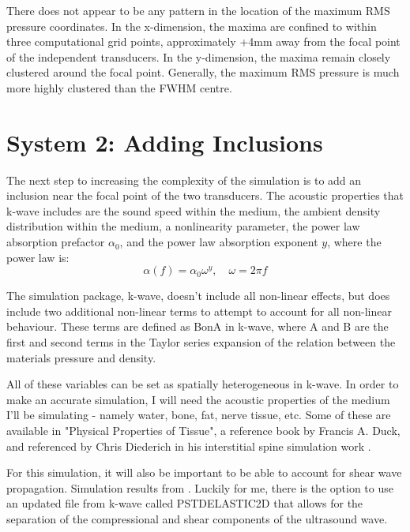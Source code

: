 \documentclass[10pt,a4paper]{article}
\begin{document}
There does not appear to be any pattern in the location of the maximum RMS pressure coordinates. In the x-dimension, the maxima are confined to within three computational grid points, approximately +4mm away from the focal point of the independent transducers. In the y-dimension, the maxima remain closely clustered around the focal point. Generally, the maximum RMS pressure is much more highly clustered than the FWHM centre.

\section{System 2: Adding Inclusions}

The next step to increasing the complexity of the simulation is to add an inclusion near the focal point of the two transducers. The acoustic properties that k-wave includes are the sound speed within the medium, the ambient density distribution within the medium, a nonlinearity parameter, the power law absorption prefactor $\alpha_0$, and the power law absorption exponent $y$, where the power law is:
\begin{equation}
\alpha(f) = \alpha_0 \omega^y, 	\quad \omega = 2 \pi f 
\end{equation}

The simulation package, k-wave, doesn't include all non-linear effects, but does include two additional non-linear terms to attempt to account for all non-linear behaviour. These terms are defined as BonA in k-wave, where A and B are the first and second terms in the Taylor series expansion of the relation between the materials pressure and density.

All of these variables can be set as spatially heterogeneous in k-wave. In order to make an accurate simulation, I will need the acoustic properties of the medium I'll be simulating - namely water, bone, fat, nerve tissue, etc. Some of these are available in "Physical Properties of Tissue", a reference book by Francis A. Duck, and referenced by Chris Diederich in his interstitial spine simulation work \cite{duck1990physical}.

For this simulation, it will also be important to be able to account for shear wave propagation. Simulation results from \cite{treeby2015contribution}. Luckily for me, there is the option to use an updated file from k-wave called PSTDELASTIC2D that allows for the separation of the compressional and shear components of the ultrasound wave. 
\end{document}
